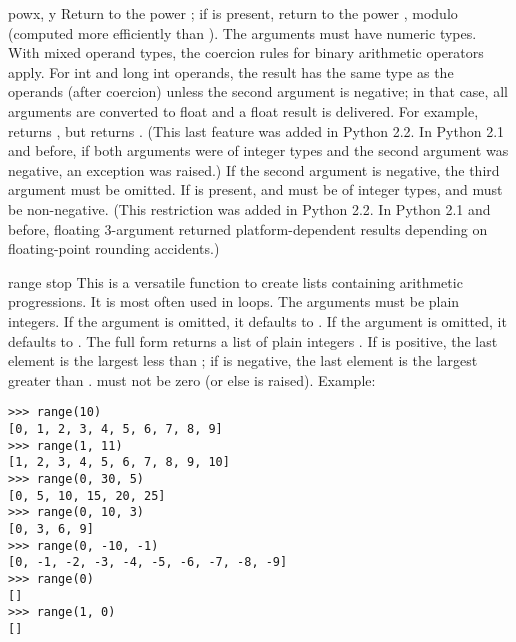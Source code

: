\begin{funcdesc}{pow}{x, y}
  Return  to the power ; if  is present, return
   to the power , modulo  (computed more
  efficiently than ).  The
  arguments must have numeric types.  With mixed operand types, the
  coercion rules for binary arithmetic operators apply.  For int and
  long int operands, the result has the same type as the operands
  (after coercion) unless the second argument is negative; in that
  case, all arguments are converted to float and a float result is
  delivered.  For example,  returns , but
   returns .  (This last feature was added in
  Python 2.2.  In Python 2.1 and before, if both arguments were of integer
  types and the second argument was negative, an exception was raised.)
  If the second argument is negative, the third argument must be omitted.
  If  is present,  and  must be of integer types,
  and  must be non-negative.  (This restriction was added in
  Python 2.2.  In Python 2.1 and before, floating 3-argument 
  returned platform-dependent results depending on floating-point
  rounding accidents.)
\end{funcdesc}

\begin{funcdesc}{range}{ stop}
  This is a versatile function to create lists containing arithmetic
  progressions.  It is most often used in  loops.  The
  arguments must be plain integers.  If the  argument is
  omitted, it defaults to .  If the  argument is
  omitted, it defaults to .  The full form returns a list of
  plain integers .  If  is positive,
  the last element is the largest  less than ; if  is negative, the last
  element is the largest 
  greater than .   must not be zero (or else
   is raised).  Example:

\begin{verbatim}
>>> range(10)
[0, 1, 2, 3, 4, 5, 6, 7, 8, 9]
>>> range(1, 11)
[1, 2, 3, 4, 5, 6, 7, 8, 9, 10]
>>> range(0, 30, 5)
[0, 5, 10, 15, 20, 25]
>>> range(0, 10, 3)
[0, 3, 6, 9]
>>> range(0, -10, -1)
[0, -1, -2, -3, -4, -5, -6, -7, -8, -9]
>>> range(0)
[]
>>> range(1, 0)
[]
\end{verbatim}
\end{funcdesc}


